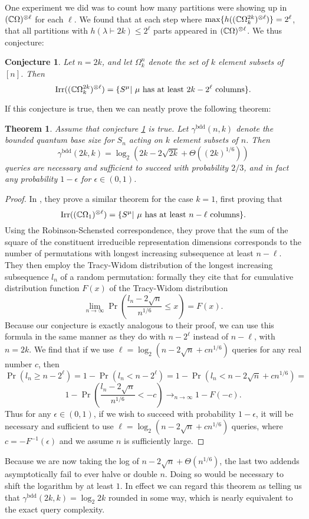 \documentclass[12pt,twoside]{reedthesis}
\theoremstyle{plain}   %
\newtheorem{thm}{Theorem}[section] %
\newtheorem{conj}{Conjecture}[section]
\theoremstyle{definition}
\theoremstyle{remark}
\numberwithin{equation}{section}
\def\irr{\mathrm{Irr}}
\begin{document}
One experiment we did was to count how many partitions were showing up in $(\mathbb{C} \Omega)^{\otimes \ell}$ for each $\ell$.
We found that at each step where $\max\{h((\mathbb{C} \Omega_k^{2k})^{\otimes \ell})\} = 2^\ell$, that all partitions with $h(\lambda \vdash 2k) \leq 2^\ell$ parts appeared in $(\mathbb{C} \Omega)^{\otimes \ell}$.
We thus conjecture:
\begin{conj}
  \label{thm:numcols}
  Let $n = 2k$, and let $\Omega^{n}_k$ denote the set of $k$ element subsets of $[n]$. Then
  \[\irr((\CC \Omega^{2k}_k)^{\otimes \ell}) = \{S^\mu |  \text{ $\mu$ has at least $2k - 2^\ell$ columns}\}.\]
\end{conj}
If this conjecture is true, then we can neatly prove the following theorem:
\begin{thm}
  Assume that conjecture \ref{thm:numcols} is true.
  Let $\gamma^{\mathrm{bdd}}(n,k)$ denote the bounded quantum base size for $S_n$ acting on $k$ element subsets of $n$. Then
  \[ \gamma^{\mathrm{bdd}}(2k,k) = \log_2(2k -2\sqrt{2k} + \Theta((2k)^{1/6}))\]
  queries are necessary and sufficient to succeed with probability $2/3$, and in fact any probability $1 - \epsilon$ for $\epsilon \in (0,1)$.
\end{thm}
\begin{proof}
  In \cite{copeland}, they prove a similar theorem for the case $k=1$, first proving that
  \[\irr((\CC \Omega_1)^{\otimes\ell}) = \{ S^\mu | \text{ $\mu$ has at least $n - \ell$ columns}\}.\]
  Using the Robinson-Schensted correspondence, they prove that the sum of the square of the constituent irreducible representation dimensions corresponds to the number of permutations with longest increasing subsequence
  at least $n-\ell$.
  They then employ the Tracy-Widom distribution
  of the longest increasing subsequence $l_n$ of a random permutation: formally they cite that for cumulative distribution function $F(x)$ of the Tracy-Widom distribution
  \[ \lim_{n \rightarrow \infty} \Pr \left( \dfrac{l_n - 2 \sqrt{n}}{n^{1/6}} \leq x \right) = F(x).\]
  Because our conjecture is exactly analogous to their proof, we can use this formula in the same manner as they do with $n- 2^\ell$ instead of $n -\ell$, with $n= 2k$.
  We find that if we use $\ell = \log_2( n - 2 \sqrt{n} + cn^{1/6})$ queries for any real number $c$, then
  \[\Pr( l_n \geq n - 2^\ell) = 1 - \Pr( l_n <  n - 2^\ell) = 1 - \Pr( l_n <  n - 2 \sqrt{n} + cn^{1/6}) = \]
  \[ 1 - \Pr \left(\dfrac{l_n - 2 \sqrt{n}}{n^{1/6}} < -c \right) \rightarrow_{n \rightarrow \infty} 1 - F(-c).\]
  Thus for any $\epsilon \in (0,1)$, if we wish to succeed with probability $1- \epsilon$, it will be necessary and sufficient to use $\ell = \log_2( n - 2 \sqrt{n} + cn^{1/6})$ queries, where $c = -F^{-1}(\epsilon)$
  and we assume $n$ is sufficiently large.
\end{proof}
Because we are now taking the log of $n - 2\sqrt{n} + \Theta(n^{1/6})$, the last two addends asymptotically fail to ever halve or double $n$.
Doing so would be necessary to shift the logarithm by at least $1$.
In effect we can regard this theorem as telling us that $\gamma^{\mathrm{bdd}}(2k,k) = \log_2 2k$ rounded in some way, which is nearly equivalent to the exact query complexity.
\end{document}
